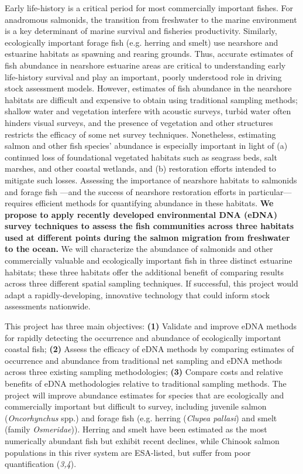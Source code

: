 \documentclass[]{article}
\begin{document}
{{ }}Early life-history is a critical period for most commercially
important fishes. For anadromous salmonids, the transition from
freshwater to the marine environment is a key determinant of marine
survival and fisheries productivity. Similarly, ecologically important
forage fish (e.g. herring and smelt) use nearshore and estuarine
habitats as spawning and rearing grounds. Thus, accurate estimates of
fish abundance in nearshore estuarine areas are critical to
understanding early life-history survival and play an important, poorly
understood role in driving stock assessment models. However, estimates
of fish abundance in the nearshore habitats are difficult and expensive
to obtain using traditional sampling methods; shallow water and
vegetation interfere with acoustic surveys, turbid water often hinders
visual surveys, and the presence of vegetation and other structures
restricts the efficacy of some net survey techniques. Nonetheless,
estimating salmon and other fish species' abundance is especially
important in light of (a) continued loss of foundational vegetated
habitats such as seagrass beds, salt marshes, and other coastal
wetlands, and (b) restoration efforts intended to mitigate such losses.
Assessing the importance of nearshore habitats to salmonids and forage
fish ---and the success of nearshore restoration efforts in
particular---requires efficient methods for quantifying abundance in
these habitats. \textbf{We propose to apply recently developed
environmental DNA (eDNA) survey techniques to assess the fish
communities across three habitats used at different points during the
salmon migration from freshwater to the ocean.} We will characterize the
abundance of salmonids and other commercially valuable and ecologically
important fish in three distinct estuarine habitats; these three
habitats offer the additional benefit of comparing results across three
different spatial sampling techniques. If successful, this project would
adapt a rapidly-developing, innovative technology that could inform
stock assessments nationwide.

This project has three main objectives: \textbf{(1)} Validate and
improve eDNA methods for rapidly detecting the occurrence and abundance
of ecologically important coastal fish; \textbf{(2)} Assess the efficacy
of eDNA methods by comparing estimates of occurrence and abundance from
traditional net sampling and eDNA methods across three existing sampling
methodologies; \textbf{(3)} Compare costs and relative benefits of eDNA
methodologies relative to traditional sampling methods. The project will
improve abundance estimates for species that are ecologically and
commercially important but difficult to survey, including juvenile
salmon (\emph{Oncorhynchus} spp.) and forage fish (e.g. herring
(\emph{Clupea pallasi}) and smelt (family \emph{Osmeridae})). Herring
and smelt have been estimated as the most numerically abundant fish but
exhibit recent declines, while Chinook salmon populations in this river
system are ESA-listed, but suffer from poor quantification (\emph{3,4}).
\end{document}
